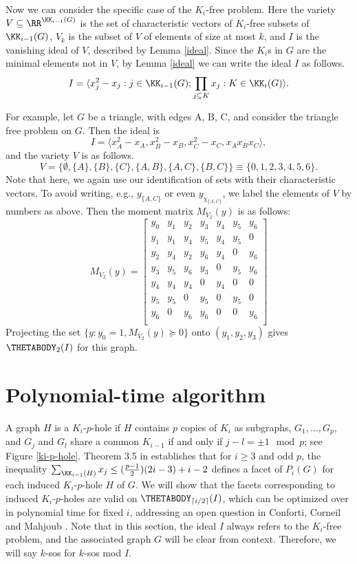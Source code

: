 Now we can consider the specific case of the $K_i$-free problem. Here the variety $V \subseteq \RR^{\KK_{i-1}(G)}$ is the set of characteristic vectors of $K_i$-free subsets of $\KK_{i-1}(G)$, $V_k$ is the subset of $V$ of elements of size at most $k$, and $I$ is the vanishing ideal of $V$, described by Lemma \ref{ideal}. Since the $K_i$s in $G$ are the minimal elements not in $V$, by Lemma \ref{ideal} we can write the ideal $I$ as follows.
$$I=\langle x_j^2 - x_j :j \in \KK_{i-1}(G); \prod_{j \subseteq K}x_j: K \in \KK_i(G)\rangle.$$

For example, let $G$ be a triangle, with edges A, B, C, and consider the triangle free problem on $G$. Then the ideal is
$$I = \langle x_A^2 - x_A, x_B^2 - x_B,  x_C^2 - x_C, x_Ax_Bx_C \rangle,$$
and the variety $V$ is as follows.
$$V = \{\emptyset,\{A\},\{B\},\{C\},\{A,B\},\{A,C\},\{B,C\}\} \equiv \{0,1,2,3,4,5,6\}.$$ 
Note that here, we again use our identification of sets with their characteristic vectors. To avoid writing, e.g., $y_{\{A,C\}}$ or even $y_{\chi_{\{A,C\}}}$, we label the elements of $V$ by numbers as above.
Then the moment matrix $M_{V_2}(y)$ is as follows:
$$M_{V_2}(y) = 
\left[
\begin{array}{ccccccc}
y_0 & y_1 & y_2 & y_3 & y_4 & y_5 & y_6 \\
y_1 & y_1 & y_4 & y_5 & y_4 & y_5 & 0 \\
y_2 & y_4 & y_2 & y_6 & y_4 & 0 & y_6 \\
y_3 & y_5 & y_6 & y_3 & 0 & y_5 & y_6 \\
y_4 & y_4 & y_4 & 0 & y_4 &0 & 0 \\
y_5& y_5 & 0 & y_5 & 0 & y_5 & 0 \\
y_6 & 0 & y_6 & y_6 & 0 & 0 & y_6 \\
\end{array}
\right]$$
Projecting the set $\{y: y_0 = 1, M_{V_2}(y) \succeq 0 \}$ onto $(y_1,y_2,y_3)$ gives $\THETABODY_2(I)$ for this graph.

\section{Polynomial-time algorithm}
A graph $H$ is a $K_i$-$p$-hole if $H$ contains $p$ copies of $K_i$ as subgraphs, $G_1, \ldots, G_p$, and $G_j$ and $G_l$ share a common $K_{i-1}$ if and only if $j-l = \pm 1 \mod p$; see Figure \ref{ki-p-hole}. Theorem 3.5 in \cite{conforti} establishes that for $i \ge 3$ and odd $p$, the inequality $\sum_{\KK_{i-1}(H)} x_j \le (\frac{p-1}{2})(2i-3)+i-2$ defines a facet of $P_i(G)$ for each induced $K_i$-$p$-hole $H$ of $G$.
We will show that the facets corresponding to induced $K_i$-$p$-holes are valid
on $\THETABODY_{\lceil i/2 \rceil}(I)$, which can be optimized over in
polynomial time for fixed $i$, addressing an open question in Conforti, Corneil and Mahjoub \cite{conforti}. Note that in this section, the ideal $I$ always refers to the $K_i$-free problem, and the associated graph $G$ will be clear from context.
Therefore, we will say $k$-sos for $k$-sos mod $I$.

